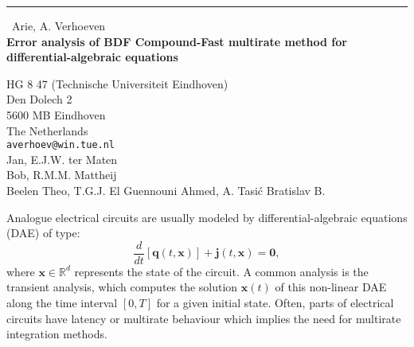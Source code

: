 \documentclass{report}
\begin{document}
\begin{center}
\rule{6in}{1pt} \
{\large Arie, A. Verhoeven \\
{\bf Error analysis of BDF Compound-Fast multirate method for differential-algebraic equations}}

HG 8 47 (Technische Universiteit Eindhoven) \\ Den Dolech 2 \\ 5600 MB Eindhoven \\ The Netherlands
\\
{\tt averhoev@win.tue.nl}\\
Jan, E.J.W. ter Maten\\
Bob, R.M.M.  Mattheij\\
	Beelen        Theo,      T.G.J.
	El Guennouni  Ahmed,     A.
	Tasi\'c       Bratislav  B.\end{center}

Analogue electrical circuits are usually modeled by differential-algebraic
equations (DAE) of type:
\begin{equation}\label{daeqj}\frac{d}{dt}\left[\mathbf{q}(t,\mathbf{x})\right]+\mathbf{j}(t,\mathbf{x})=\mathbf{0},\end{equation}
where $\mathbf{x} \in \mathbb{R}^d$ represents the state of the circuit.
A common analysis is the transient analysis, which computes the solution
$\mathbf{x}(t)$ of this non-linear DAE along the time interval
$[0,T]$ for a given initial state.
Often, parts of electrical circuits have latency or multirate behaviour which
implies the need for multirate integration methods.
\end{document}
